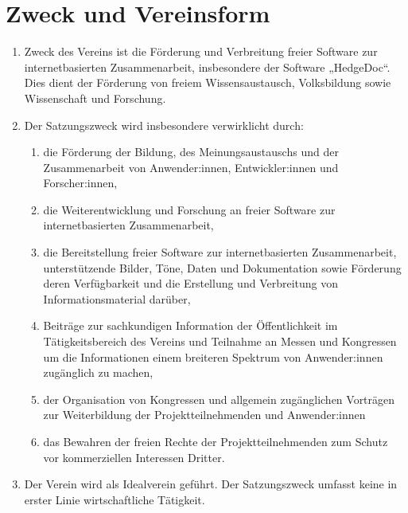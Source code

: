 \documentclass[12pt,paper=a4,ngerman]{scrreprt}
\begin{document}
	\section{Zweck und Vereinsform}
	\begin{enumerate}
		\item
			Zweck des Vereins ist die Förderung und Verbreitung freier Software zur internetbasierten Zusammenarbeit, insbesondere der Software „HedgeDoc“. Dies dient der Förderung von freiem Wissensaustausch, Volksbildung sowie Wissenschaft und Forschung.
		\item
			Der Satzungszweck wird insbesondere verwirklicht durch:
		    \begin{enumerate}
    			\item
    			    die Förderung der Bildung, des Meinungsaustauschs und der Zusammenarbeit von Anwender:innen, Entwickler:innen und Forscher:innen,
			    \item
			        die Weiterentwicklung und Forschung an freier Software zur internetbasierten Zusammenarbeit,
		        \item
		            die Bereitstellung freier Software zur internetbasierten Zusammenarbeit, unterstützende Bilder, Töne, Daten und Dokumentation sowie Förderung deren Verfügbarkeit und die Erstellung und Verbreitung von Informationsmaterial darüber,
	            \item
	                Beiträge zur sachkundigen Information der Öffentlichkeit im Tätigkeitsbereich des Vereins und Teilnahme an Messen und Kongressen um die Informationen einem breiteren Spektrum von Anwender:innen zugänglich zu machen,
	            \item
	                der Organisation von Kongressen und allgemein zugänglichen Vorträgen zur Weiterbildung der Projektteilnehmenden und Anwender:innen
	            \item
	                das Bewahren der freien Rechte der Projektteilnehmenden zum Schutz vor kommerziellen Interessen Dritter. 
		    \end{enumerate}
		\item Der Verein wird als Idealverein geführt. Der Satzungszweck umfasst keine in erster Linie wirtschaftliche Tätigkeit.
	\end{enumerate}
	
\end{document}
